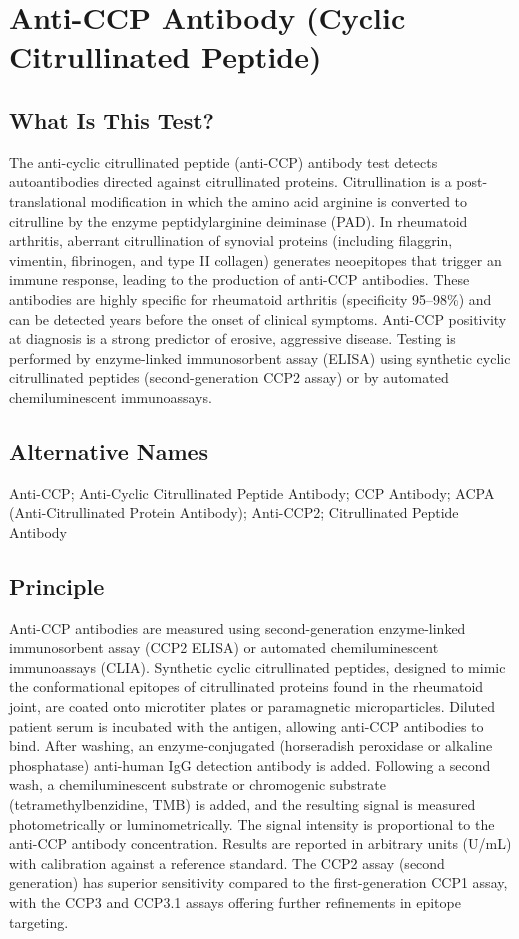 \chapter{Anti-CCP Antibody (Cyclic Citrullinated Peptide)}

\section*{What Is This Test?}
The anti-cyclic citrullinated peptide (anti-CCP) antibody test detects autoantibodies directed against citrullinated proteins. Citrullination is a post-translational modification in which the amino acid arginine is converted to citrulline by the enzyme peptidylarginine deiminase (PAD). In rheumatoid arthritis, aberrant citrullination of synovial proteins (including filaggrin, vimentin, fibrinogen, and type II collagen) generates neoepitopes that trigger an immune response, leading to the production of anti-CCP antibodies. These antibodies are highly specific for rheumatoid arthritis (specificity 95--98\%) and can be detected years before the onset of clinical symptoms. Anti-CCP positivity at diagnosis is a strong predictor of erosive, aggressive disease. Testing is performed by enzyme-linked immunosorbent assay (ELISA) using synthetic cyclic citrullinated peptides (second-generation CCP2 assay) or by automated chemiluminescent immunoassays.

\section*{Alternative Names}
Anti-CCP; Anti-Cyclic Citrullinated Peptide Antibody; CCP Antibody; ACPA (Anti-Citrullinated Protein Antibody); Anti-CCP2; Citrullinated Peptide Antibody

\section*{Principle}
Anti-CCP antibodies are measured using second-generation enzyme-linked immunosorbent assay (CCP2 ELISA) or automated chemiluminescent immunoassays (CLIA). Synthetic cyclic citrullinated peptides, designed to mimic the conformational epitopes of citrullinated proteins found in the rheumatoid joint, are coated onto microtiter plates or paramagnetic microparticles. Diluted patient serum is incubated with the antigen, allowing anti-CCP antibodies to bind. After washing, an enzyme-conjugated (horseradish peroxidase or alkaline phosphatase) anti-human IgG detection antibody is added. Following a second wash, a chemiluminescent substrate or chromogenic substrate (tetramethylbenzidine, TMB) is added, and the resulting signal is measured photometrically or luminometrically. The signal intensity is proportional to the anti-CCP antibody concentration. Results are reported in arbitrary units (U/mL) with calibration against a reference standard. The CCP2 assay (second generation) has superior sensitivity compared to the first-generation CCP1 assay, with the CCP3 and CCP3.1 assays offering further refinements in epitope targeting.


